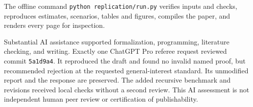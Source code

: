 The offline command \texttt{python replication/run.py} verifies inputs and checks, reproduces estimates, scenarios, tables and figures, compiles the paper, and renders every page for inspection.

Substantial AI assistance supported formalization, programming, literature checking, and writing. Exactly one ChatGPT Pro referee request reviewed commit \texttt{5a1d9a4}. It reproduced the draft and found no invalid named proof, but recommended rejection at the requested general-interest standard. Its unmodified report and the response are preserved. The added recursive benchmark and revisions received local checks without a second review. This AI assessment is not independent human peer review or certification of publishability.
